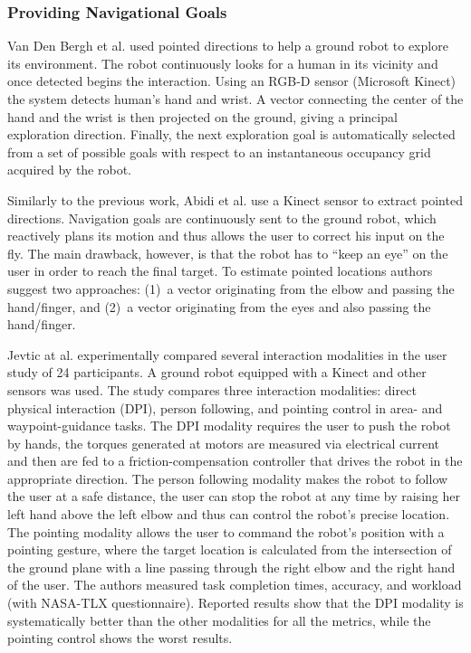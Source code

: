 \subsubsection*{Providing Navigational Goals}
Van Den Bergh et al. \cite{VanDenBergh2011} used pointed directions to help a ground robot to explore its environment. The robot continuously looks for a human in its vicinity and once detected begins the interaction. Using an RGB-D sensor (Microsoft Kinect) the system detects human's hand and wrist. A vector connecting the center of the hand and the wrist is then projected on the ground, giving a principal exploration direction. Finally, the next exploration goal is automatically selected from a set of possible goals with respect to an instantaneous occupancy grid acquired by the robot. 

Similarly to the previous work, Abidi et al. \cite{Abidi2013} use a Kinect sensor to extract pointed directions. Navigation goals are continuously sent to the ground robot, which reactively plans its motion and thus allows the user to correct his input on the fly. The main drawback, however, is that the robot has to ``keep an eye'' on the user in order to reach the final target. To estimate pointed locations authors suggest two approaches: (1)~a vector originating from the elbow and passing the hand/finger, and (2)~a vector originating from the eyes and also passing the hand/finger.

Jevtic at al. \cite{Jevtic2015} experimentally compared several interaction modalities in the user study of 24 participants. A ground robot equipped with a Kinect and other sensors was used. The study compares three interaction modalities: direct physical interaction (DPI), person following, and pointing control in area- and waypoint-guidance tasks. The DPI modality requires the user to push the robot by hands, the torques generated at motors are measured via electrical current and then are fed to a friction-compensation controller that drives the robot in the appropriate direction. The person following modality makes the robot to follow the user at a safe distance, the user can stop the robot at any time by raising her left hand above the left elbow and thus can control the robot's precise location. The pointing modality allows the user to command the robot's position with a pointing gesture, where the target location is calculated from the intersection of the ground plane with a line passing through the right elbow and the right hand of the user.
The authors measured task completion times, accuracy, and workload (with NASA-TLX questionnaire). Reported results show that the DPI modality is systematically better than the other modalities for all the metrics, while the pointing control shows the worst results.

